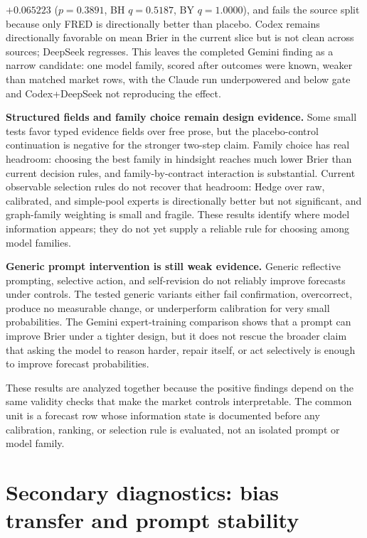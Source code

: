 \documentclass[11pt]{article}
\begin{document}
\(+0.065223\) (\(p=0.3891\), BH \(q=0.5187\), BY \(q=1.0000\)), and fails the source split because only FRED is directionally better than placebo. Codex remains directionally favorable on mean Brier in the current slice but is not clean across sources; DeepSeek regresses. This leaves the completed Gemini finding as a narrow candidate: one model family, scored after outcomes were known, weaker than matched market rows, with the Claude run underpowered and below gate and Codex+DeepSeek not reproducing the effect.

\textbf{Structured fields and family choice remain design evidence.} Some small tests favor typed evidence fields over free prose, but the placebo-control continuation is negative for the stronger two-step claim. Family choice has real headroom: choosing the best family in hindsight reaches much lower Brier than current decision rules, and family-by-contract interaction is substantial. Current observable selection rules do not recover that headroom: Hedge over raw, calibrated, and simple-pool experts is directionally better but not significant, and graph-family weighting is small and fragile. These results identify where model information appears; they do not yet supply a reliable rule for choosing among model families.

\textbf{Generic prompt intervention is still weak evidence.} Generic reflective prompting, selective action, and self-revision do not reliably improve forecasts under controls. The tested generic variants either fail confirmation, overcorrect, produce no measurable change, or underperform calibration for very small probabilities. The Gemini expert-training comparison shows that a prompt can improve Brier under a tighter design, but it does not rescue the broader claim that asking the model to reason harder, repair itself, or act selectively is enough to improve forecast probabilities.

These results are analyzed together because the positive findings depend on the same validity checks that make the market controls interpretable. The common unit is a forecast row whose information state is documented before any calibration, ranking, or selection rule is evaluated, not an isolated prompt or model family.

\section{Secondary diagnostics: bias transfer and prompt stability}
\label{sec:bias-transfer}
\label{sec:prompt-invariance}
\label{sec:freq-framing-test}
\end{document}
